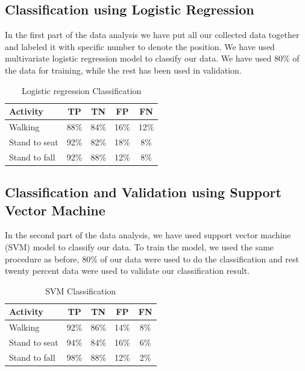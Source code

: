 \documentclass[letterpaper]{article}
\begin{document}
\subsection{Classification using Logistic Regression}

In the first part of the data analysis we have put all our collected data together and labeled it
with specific number to denote the position. We have used multivariate logistic regression model to
classify our data. We have used 80\% of the data for training, while the rest has been used
in validation.


\begin{table}[!ht]
\caption{Logistic regression Classification}
	\label{tab:human-logistic-class}
	\centering
		\begin{tabular} {|l |c |c |c|c|}
			\hline
			{\bf Activity} & {\bf  TP}  &	{\bf TN}  &	{\bf FP} &	{\bf FN} \\ 
			\hline
			Walking	& 88\%	& 84\%	& 16\%	& 12\% \\ \hline
			Stand to seat	& 92\%	& 82\%	& 18\% & 	8\%	 \\ \hline 
			Stand to fall	& 92\%	& 88\%	& 12\%	& 8\%	 \\ \hline
		\end{tabular}
\end{table}




\subsection{Classification and Validation using Support Vector Machine}

In the second part of the data analysis, we have used support vector machine (SVM) model
to classify our data. To train the model, we used the same procedure as before, 80\% of
our data were used to do the classification and rest twenty percent data were used to validate our
classification result.




\begin{table}[!ht]
\caption{SVM Classification}
	\label{tab:human-svm-class}
	\centering
		\begin{tabular} {|l |c |c |c|c|}
			\hline
			{\bf Activity} & {\bf  TP}  &	{\bf TN}  &	{\bf FP} &	{\bf FN} \\ 
			\hline
			Walking	& 92\%	& 86\%	& 14\%	& 8\% \\ \hline
			Stand to seat	& 94\%	& 84\%	& 16\% & 	6\%	 \\ \hline 
			Stand to fall	& 98\%	& 88\%	& 12\%	& 2\%	 \\ \hline
		\end{tabular}
\end{table}
\end{document}
